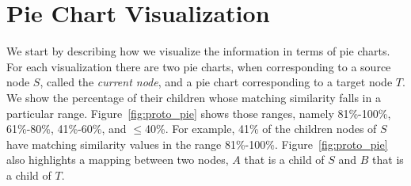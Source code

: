 


\section{Pie Chart Visualization}

We start by describing how we visualize the information in terms of pie
charts. For each visualization there are two pie charts, when
corresponding to a source node $S$, called the {\it current node\/},
and a pie chart corresponding to a target node $T$. We show the
percentage of their children
whose matching similarity falls in a particular
range. Figure~\ref{fig:proto_pie} shows those ranges, namely
81\%-100\%, 61\%-80\%, 41\%-60\%, and $\le$40\%. %
For example, 41\% of the children nodes of $S$ have matching
similarity values in the range 81\%-100\%. Figure~\ref{fig:proto_pie}
also highlights a mapping between two nodes, $A$ that is a child of
$S$ and $B$ that is a child of $T$. 

